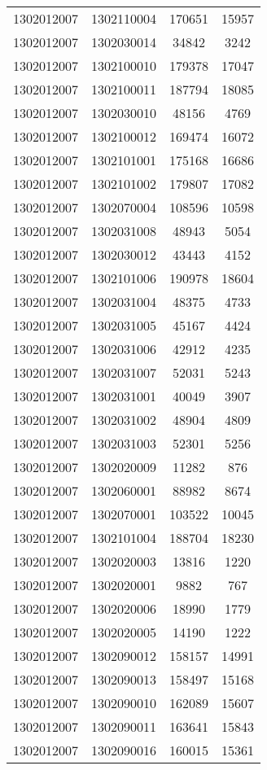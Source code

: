 \begin{longtable}[h]{llcc}
		1302012007 & 1302110004 & 170651 & 15957\\
		1302012007 & 1302030014 & 34842 & 3242\\
		1302012007 & 1302100010 & 179378 & 17047\\
		1302012007 & 1302100011 & 187794 & 18085\\
		1302012007 & 1302030010 & 48156 & 4769\\
		1302012007 & 1302100012 & 169474 & 16072\\
		1302012007 & 1302101001 & 175168 & 16686\\
		1302012007 & 1302101002 & 179807 & 17082\\
		1302012007 & 1302070004 & 108596 & 10598\\
		1302012007 & 1302031008 & 48943 & 5054\\
		1302012007 & 1302030012 & 43443 & 4152\\
		1302012007 & 1302101006 & 190978 & 18604\\
		1302012007 & 1302031004 & 48375 & 4733\\
		1302012007 & 1302031005 & 45167 & 4424\\
		1302012007 & 1302031006 & 42912 & 4235\\
		1302012007 & 1302031007 & 52031 & 5243\\
		1302012007 & 1302031001 & 40049 & 3907\\
		1302012007 & 1302031002 & 48904 & 4809\\
		1302012007 & 1302031003 & 52301 & 5256\\
		1302012007 & 1302020009 & 11282 & 876\\
		1302012007 & 1302060001 & 88982 & 8674\\
		1302012007 & 1302070001 & 103522 & 10045\\
		1302012007 & 1302101004 & 188704 & 18230\\
		1302012007 & 1302020003 & 13816 & 1220\\
		1302012007 & 1302020001 & 9882 & 767\\
		1302012007 & 1302020006 & 18990 & 1779\\
		1302012007 & 1302020005 & 14190 & 1222\\
		1302012007 & 1302090012 & 158157 & 14991\\
		1302012007 & 1302090013 & 158497 & 15168\\
		1302012007 & 1302090010 & 162089 & 15607\\
		1302012007 & 1302090011 & 163641 & 15843\\
		1302012007 & 1302090016 & 160015 & 15361\\

\end{longtable}
